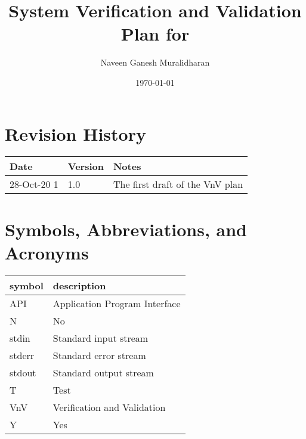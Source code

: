 \documentclass[12pt, titlepage]{article}
\begin{document}
\title{System Verification and Validation Plan for \progname{}} 
\author{Naveen Ganesh Muralidharan}
\date{\today}
	
\maketitle


\section{Revision History}

\begin{tabularx}{\textwidth}{p{3cm}p{2cm}X}
\toprule {\bf Date} & {\bf Version} & {\bf Notes}\\
\midrule
28-Oct-20 1 & 1.0 & The first draft of the VnV plan\\
\bottomrule
\end{tabularx}

\newpage

\tableofcontents

\listoftables

\listoffigures

\newpage

\section{Symbols, Abbreviations, and Acronyms}

\renewcommand{\arraystretch}{1.2}
\begin{tabular}{l l} 
  \toprule		
  \textbf{symbol} & \textbf{description}\\
  \midrule 
  API & Application Program Interface\\
  N & No\\
  stdin & Standard input stream\\
  stderr & Standard error stream\\
  stdout & Standard output stream\\
  T & Test\\
  VnV & Verification and Validation\\
  Y & Yes\\
  \bottomrule
\end{tabular}\\

\end{document}

